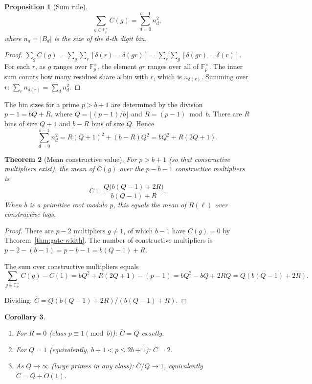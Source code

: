 \documentclass[12pt]{amsart}
\newtheorem{theorem}{Theorem}
\newtheorem{proposition}[theorem]{Proposition}
\newtheorem{corollary}[theorem]{Corollary}
\theoremstyle{definition}
\theoremstyle{remark}
\begin{document}
\begin{proposition}[Sum rule]\label{prop:sum-rule}
\[
\sum_{g \in \mathbb{F}_p^{\times}} C(g)
= \sum_{d=0}^{b-1} n_d^2,
\]
where $n_d = |B_d|$ is the size of the $d$-th digit bin.
\end{proposition}

\begin{proof}
$\sum_g C(g) = \sum_g \sum_r [\delta(r) = \delta(gr)]
= \sum_r \sum_g [\delta(gr) = \delta(r)]$.
For each $r$, as $g$ ranges over $\mathbb{F}_p^{\times}$, the
element $gr$ ranges over all of $\mathbb{F}_p^{\times}$.
The inner sum counts how many residues share a bin with $r$,
which is $n_{\delta(r)}$. Summing over $r$:
$\sum_r n_{\delta(r)} = \sum_d n_d^2$.
\end{proof}

The bin sizes for a prime $p > b + 1$ are determined by the division
$p - 1 = bQ + R$, where $Q = \lfloor (p{-}1)/b \rfloor$ and $R
= (p{-}1) \bmod b$. There are $R$ bins of size $Q + 1$ and $b -
R$ bins of size $Q$. Hence
\[
\sum_{d=0}^{b-1} n_d^2 = R(Q+1)^2 + (b-R)Q^2 = bQ^2 + R(2Q + 1).
\]

\begin{theorem}[Mean constructive value]\label{thm:mean}
For $p > b + 1$ (so that constructive multipliers
exist), the mean of $C(g)$ over the $p - b - 1$
constructive multipliers is
\[
\overline{C} = \frac{Q\bigl(b(Q{-}1) + 2R\bigr)}{b(Q{-}1) + R}.
\]
When $b$ is a primitive root modulo $p$, this equals the mean of
$R(\ell)$ over constructive lags.
\end{theorem}

\begin{proof}
There are $p - 2$ multipliers $g \ne 1$, of which $b - 1$ have
$C(g) = 0$ by Theorem~\ref{thm:gate-width}. The number of
constructive multipliers is $p - 2 - (b-1) = p - b - 1
= b(Q{-}1) + R$.

The sum over constructive multipliers equals
\[
\sum_{g \in \mathbb{F}_p^\times} C(g) - C(1)
= bQ^2 + R(2Q+1) - (p-1)
= bQ^2 - bQ + 2RQ
= Q(b(Q{-}1) + 2R).
\]

Dividing: $\overline{C} = Q(b(Q{-}1) + 2R) / (b(Q{-}1) + R)$.
\end{proof}

\begin{corollary}\label{cor:special-cases}
\begin{enumerate}
\item For $R = 0$ (class $p \equiv 1 \pmod{b}$):
      $\overline{C} = Q$ exactly.
\item For $Q = 1$ (equivalently, $b+1 < p \le 2b+1$):
      $\overline{C} = 2$.
\item As $Q \to \infty$ (large primes in any class):
      $\overline{C}/Q \to 1$, equivalently
      $\overline{C} = Q + O(1)$.
\end{enumerate}
\end{corollary}
\end{document}
